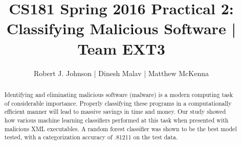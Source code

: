 \documentclass{article}
\begin{document}
\title{CS181 Spring 2016 Practical 2: Classifying Malicious Software | Team EXT3}
\author{Robert J. Johnson | Dinesh Malav | Matthew McKenna}



\maketitle

\begin{abstract}
Identifying and eliminating malicious software (malware) is a modern computing task of considerable importance. Properly classifying these programs in a computationally efficient manner will lead to massive savings in time and money. Our study showed how various machine learning classifiers performed at this task when presented with malicious XML executables. A random forest classifier was shown to be the best model tested, with a categorization accuracy of .81211 on the test data. 
\end{abstract}
\end{document}

